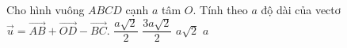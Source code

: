 \begin{ex}%
	Cho hình vuông $ABCD$ cạnh $a$ tâm $O$. Tính theo $a$ độ dài của vectơ\break $\overrightarrow{u}=\overrightarrow{AB}+\overrightarrow{OD} -\overrightarrow{BC}$.
		\choice
		{\True $\dfrac{a\sqrt{2}}{2}$}
		{$\dfrac{3a\sqrt{2}}{2}$}
		{$a\sqrt{2}$}
		{$a$}
\end{ex}
